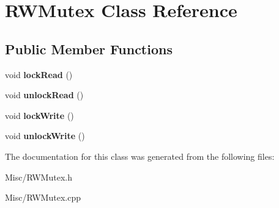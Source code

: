 \hypertarget{classRWMutex}{}\section{R\+W\+Mutex Class Reference}
\label{classRWMutex}
\subsection*{Public Member Functions}
\begin{DoxyCompactItemize}
\item 
\mbox{\label{classRWMutex_ab76f003469059259e2a48e9ed6643c25}} 
void {\bfseries lock\+Read} ()
\item 
\mbox{\label{classRWMutex_aa71e2ce4d243c3d4c471a7fe55381b2f}} 
void {\bfseries unlock\+Read} ()
\item 
\mbox{\label{classRWMutex_ac977d0b492c040e36a77b55ee3ae9c04}} 
void {\bfseries lock\+Write} ()
\item 
\mbox{\label{classRWMutex_a2f145529b60c90b3eba0ac0fd547f2b2}} 
void {\bfseries unlock\+Write} ()
\end{DoxyCompactItemize}


The documentation for this class was generated from the following files\+:\begin{DoxyCompactItemize}
\item 
Misc/R\+W\+Mutex.\+h\item 
Misc/R\+W\+Mutex.\+cpp\end{DoxyCompactItemize}
